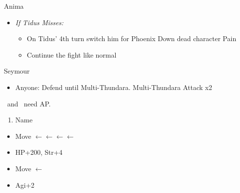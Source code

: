 \begin{battle}[18000]{Anima}
    \begin{itemize}
        \item \textit{If Tidus Misses:}
        \begin{itemize}
            \item On Tidus' 4th turn switch him for \lulu
            \luluf Phoenix Down dead character
            \enemyf Pain
            \item Continue the fight like normal
        \end{itemize}
    \end{itemize}
\end{battle}
\begin{battle}[6000]{Seymour}
    \begin{itemize}
        \tidusf Phoenix Down \rikku\ if she died before Multi-Thundara.
        \item Anyone: Defend until Multi-Thundara.
        \enemyf Multi-Thundara
        \tidusf Attack x2
    \end{itemize}
    \tidus\ and \yuna\ need AP.
\end{battle}
\begin{enumerate}[resume]
    \item Name \shiva
\end{enumerate}
\begin{spheregrid}
    \begin{itemize}
        \tidusf
        \begin{itemize}
            \item Move $\leftarrow\leftarrow\leftarrow\leftarrow$
            \item HP+200, Str+4
            \item Move $\leftarrow$
            \item Agi+2
        \end{itemize}
    \end{itemize}
\end{spheregrid}
